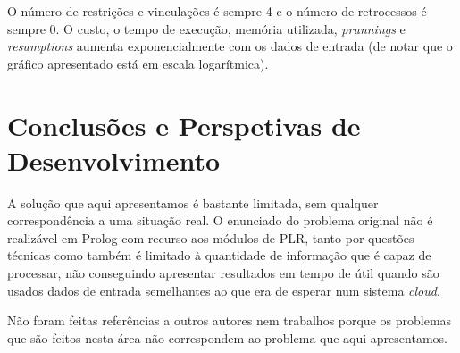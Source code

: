 \documentclass{llncs}
\begin{document}
O número de restrições e vinculações é sempre 4 e o número de retrocessos é sempre 0. O custo, o tempo de execução, memória utilizada, \textit{prunnings} e \textit{resumptions} aumenta exponencialmente com os dados de entrada (de notar que o gráfico apresentado está em escala logarítmica).

\section{Conclusões e Perspetivas de Desenvolvimento}\label{sec:Conclusions and Future Work}

A solução que aqui apresentamos é bastante limitada, sem qualquer correspondência a uma situação real. O enunciado do problema original não é realizável em Prolog com recurso aos módulos de PLR, tanto por questões técnicas como também é limitado à quantidade de informação que é capaz de processar, não conseguindo apresentar resultados em tempo de útil quando são usados dados de entrada semelhantes ao que era de esperar num sistema \textit{cloud}.


Não foram feitas referências a outros autores nem trabalhos porque os problemas que são feitos nesta área não correspondem ao problema que aqui apresentamos.

\end{document}
